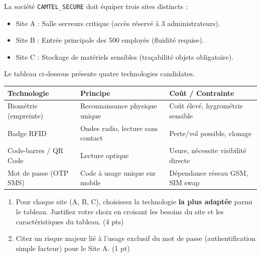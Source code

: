 \documentclass[11pt]{article}
\begin{document}
\begin{exercice}
La société \texttt{CAMTEL\_SECURE} doit équiper trois sites distincts :
\begin{itemize}
    \item Site A : Salle serveurs critique (accès réservé à 3 administrateurs).
    \item Site B : Entrée principale des 500 employés (fluidité requise).
    \item Site C : Stockage de matériels sensibles (traçabilité objets obligatoire).
\end{itemize}
Le tableau ci-dessous présente quatre technologies candidates.

\begin{tabularx}{\linewidth}{|l|X|X|}
\hline
\textbf{Technologie} & \textbf{Principe} & \textbf{Coût / Contrainte} \\ \hline
Biométrie (empreinte) & Reconnaissance physique unique & Coût élevé, hygrométrie sensible \\ \hline
Badge RFID & Ondes radio, lecture sans contact & Perte/vol possible, clonage \\ \hline
Code-barres / QR Code & Lecture optique & Usure, nécessite visibilité directe \\ \hline
Mot de passe (OTP SMS) & Code à usage unique sur mobile & Dépendance réseau GSM, SIM swap \\ \hline
\end{tabularx}

\begin{enumerate}
    \item Pour chaque site (A, B, C), choisissez la technologie \textbf{la plus adaptée} parmi le tableau. Justifiez votre choix en croisant les besoins du site et les caractéristiques du tableau. \hfill (4 pts)
    \item Citez un risque majeur lié à l'usage exclusif du mot de passe (authentification simple facteur) pour le Site A. \hfill (1 pt)
\end{enumerate}
\end{exercice}
\end{document}
